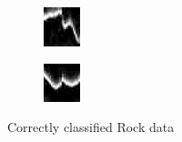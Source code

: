 \documentclass[english, 12pt]{article}
\begin{document}
\begin{figure}[H]
\begin{subfigure}[b]{0.2\textwidth}
        \caption{}
    \end{subfigure}
    \begin{subfigure}[b]{0.2\textwidth}
        \includegraphics[width=\textwidth]{CC13.jpg}
        \caption{}
    \end{subfigure}
    \begin{subfigure}[b]{0.2\textwidth}
        \includegraphics[width=\textwidth]{CC14.jpg}
        \caption{}
    \end{subfigure}
    \caption{Correctly classified Rock data}\label{fig:cc1}
\end{figure}
\end{document}
